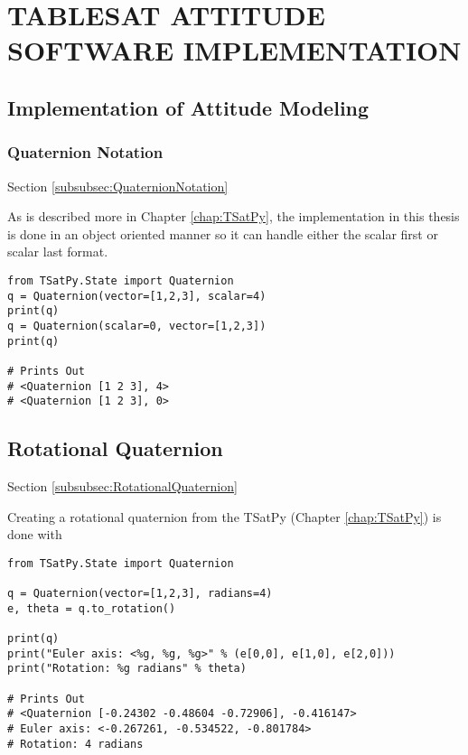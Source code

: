 
\chapter{TABLESAT ATTITUDE SOFTWARE IMPLEMENTATION}
\label{chap:TableSatAttitudeDynamicsSoftware}

\section{Implementation of Attitude Modeling}
\label{sec:ImplementationofAttitudeModeling}


\subsection{Quaternion Notation}
\label{subsec:Implementation-QuaternionNotation}
Section \ref{subsubsec:QuaternionNotation}

As is described more in Chapter \ref{chap:TSatPy}, the implementation in this thesis is done in an object oriented manner so it can handle either the scalar first or scalar last format.

\begin{singlespace}
  \begin{verbatim}
from TSatPy.State import Quaternion
q = Quaternion(vector=[1,2,3], scalar=4)
print(q)
q = Quaternion(scalar=0, vector=[1,2,3])
print(q)

# Prints Out
# <Quaternion [1 2 3], 4>
# <Quaternion [1 2 3], 0>
  \end{verbatim}
  \nocite{minted}
\end{singlespace}

\section{Rotational Quaternion}
\label{sec:Implementation-RotationalQuaternion}
Section \ref{subsubsec:RotationalQuaternion}

Creating a rotational quaternion from the TSatPy (Chapter \ref{chap:TSatPy}) is done with

\begin{singlespace}
  \begin{verbatim}
from TSatPy.State import Quaternion

q = Quaternion(vector=[1,2,3], radians=4)
e, theta = q.to_rotation()

print(q)
print("Euler axis: <%g, %g, %g>" % (e[0,0], e[1,0], e[2,0]))
print("Rotation: %g radians" % theta)

# Prints Out
# <Quaternion [-0.24302 -0.48604 -0.72906], -0.416147>
# Euler axis: <-0.267261, -0.534522, -0.801784>
# Rotation: 4 radians
  \end{verbatim}
  \nocite{minted}
\end{singlespace}

